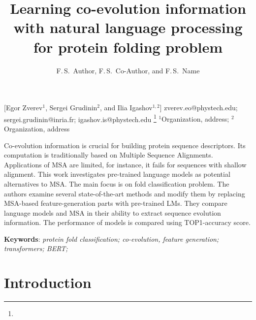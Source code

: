 \documentclass[12pt, twoside]{article}
\begin{document}
\English
\title
	[] %
    { Learning co-evolution information with natural language processing for protein folding problem} %
\author
	[F.\,S.~Author] %
	{F.\,S.~Author, F.\,S.~Co-Author, and F.\,S.~Name} %
    [Egor Zverev$^1$, Sergei Grudinin$^2$, and Ilia Igashov$^{1, 2}$] %
\email
    {zverev.eo@phystech.edu; sergei.grudinin@inria.fr; igashov.is@phystech.edu}
\thanks
    {}
\organization
    {$^1$Organization, address;
     $^2$Organization, address}
\abstract
    {Co-evolution information is crucial for building protein sequence descriptors. Its computation is traditionally based on Multiple Sequence Alignments. Applications of MSA are limited, for instance, it fails for sequences with shallow alignment. This work investigates pre-trained language models as potential alternatives to MSA. The main focus is on fold classification problem. The authors examine several  state-of-the-art  methods  and  modify  them  by  replacing  MSA-based  feature-generation parts with pre-trained LMs. They compare language models and MSA in their ability to extract sequence evolution information. The performance of models is compared using TOP1-accuracy score.

		
	\noindent
    	\textbf{Keywords}: \emph{protein fold classification; co-evolution, feature generation; transformers; BERT;  }}





\maketitle
\linenumbers

\section{Introduction}
\noindent %
\end{document}
